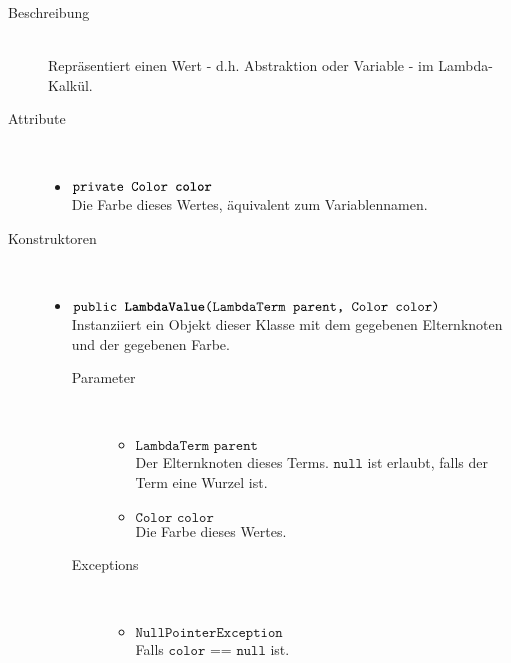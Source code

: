 \begin{description}
\item[Beschreibung] \hfill \\ Repräsentiert einen Wert - d.h. Abstraktion oder Variable - im Lambda-Kalkül.
\item[Attribute] \hfill \\
	\vspace{-.8cm}
	\begin{itemize}
		\item $\texttt{private Color \textbf{color}}$ \\ Die Farbe dieses Wertes, äquivalent zum Variablennamen.
	\end{itemize}
	
\item[Konstruktoren] \hfill \\
	\vspace{-.8cm}
	\begin{itemize}
		\item $\texttt{public \textbf{LambdaValue}(LambdaTerm parent, Color color)}$ \\ Instanziiert ein Objekt dieser Klasse mit dem gegebenen Elternknoten und der gegebenen Farbe.
		\begin{description}
			\item[Parameter] \hfill \\
			\vspace{-.8cm}
			\begin{itemize}
				\item $\texttt{LambdaTerm parent}$ \\ Der Elternknoten dieses Terms. $\texttt{null}$ ist erlaubt, falls der Term eine Wurzel ist.
				\item $\texttt{Color color}$ \\ Die Farbe dieses Wertes.
			\end{itemize}
			\item[Exceptions] \hfill \\
			\vspace{-.8cm}
			\begin{itemize}
				\item $\texttt{NullPointerException}$ \\ Falls $\texttt{color == null}$ ist.
			\end{itemize}
		\end{description}
	\end{itemize}
	

\end{description}
